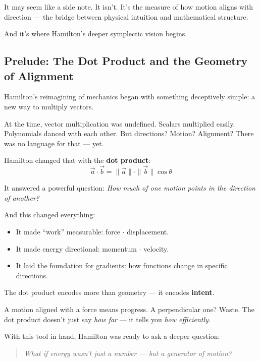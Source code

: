 It may seem like a side note. It isn’t.  
It’s the measure of how motion aligns with direction — the bridge between physical intuition and mathematical structure.

And it’s where Hamilton’s deeper symplectic vision begins.
\subsection{Prelude: The Dot Product and the Geometry of Alignment}

Hamilton’s reimagining of mechanics began with something deceptively simple: a new way to multiply vectors.

At the time, vector multiplication was undefined. Scalars multiplied easily. Polynomials danced with each other. But directions? Motion? Alignment? There was no language for that — yet.

Hamilton changed that with the \textbf{dot product}:
\[
\vec{a} \cdot \vec{b} = \|\vec{a}\| \cdot \|\vec{b}\| \cos \theta
\]

It answered a powerful question:  
\textit{How much of one motion points in the direction of another?}

And this changed everything:
\begin{itemize}
    \item It made “work” measurable: force $\cdot$ displacement.
    \item It made energy directional: momentum $\cdot$ velocity.
    \item It laid the foundation for gradients: how functions change in specific directions.
\end{itemize}

\begin{tcolorbox}[colback=blue!5!white, colframe=blue!50!black, title={Sidebar: Alignment as Information}]
    The dot product encodes more than geometry — it encodes \textbf{intent}.  

    A motion aligned with a force means progress. A perpendicular one? Waste.  
    The dot product doesn’t just say \emph{how far} — it tells you \emph{how efficiently}.
\end{tcolorbox}

With this tool in hand, Hamilton was ready to ask a deeper question:

\begin{quote}
    \emph{What if energy wasn't just a number — but a generator of motion?}
\end{quote}

